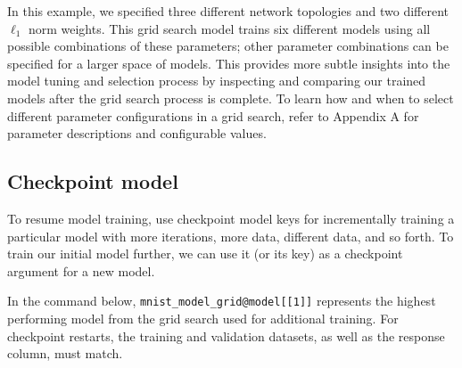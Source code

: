 \waterExampleInR


\waterExampleInPython



\normalsize
\noindent
In this example, we specified three different network topologies and two different $\ell_1$ norm weights. This grid search model trains six different models using all possible combinations of these parameters; other parameter combinations can be specified for a larger space of models. This provides more subtle insights into the model tuning and selection process by inspecting and comparing our trained models after the grid search process is complete. To learn how and when to select different parameter configurations in a grid search, refer to Appendix A for parameter descriptions and configurable values.

%
%
%

\waterExampleInR


\waterExampleInPython



\subsection{Checkpoint model}

To resume model training, use checkpoint model keys for incrementally training a particular model with more iterations, more data, different data, and so forth. To train our initial model further, we can use it (or its key) as a checkpoint argument for a new model.

In the command below, \texttt{mnist\_model\_grid@model[[1]]} represents the highest performing model from the grid search used for additional training. For checkpoint restarts, the training and validation datasets, as well as the response column, must match.


